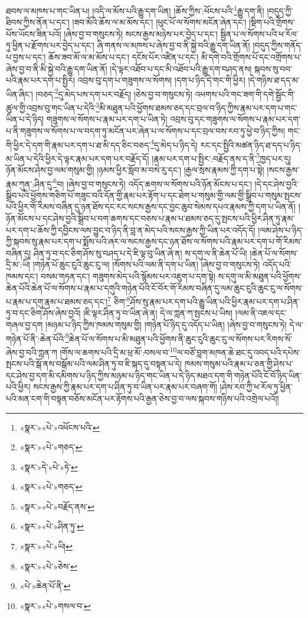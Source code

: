 ཐབས་ལ་མཁས་པ་གང་ཡིན་པ། །འདི་ལ་མོས་པའི་རྒྱུ་དག་ཡིན། །ཆོས་ཀྱིས་:ཕོངས་པའི་\footnote{«སྣར་»«པེ་»འཕོངས་པའི་}རྒྱུ་དག་ནི། །བདུད་ཀྱི་ཐིབས་ཀྱིས་ནོན་པ་དང་། །ཟབ་མོའི་ཆོས་ལ་མ་མོས་དང་། །ཕུང་པོ་ལ་སོགས་མངོན་ཞེན་དང་། །སྡིག་པའི་གྲོགས་པོས་ཡོངས་ཟིན་པའོ། །ཞེས་བྱ་བ་གསུངས་ཏེ། སངས་རྒྱས་མཉེས་པར་བྱེད་པ་དང་། སྦྱིན་པ་ལ་སོགས་པའི་ཕ་རོལ་ཏུ་ཕྱིན་པ་རྫོགས་པར་བྱེད་པ་དང་། ཞི་གནས་ལ་མཁས་པ་ཞེས་བྱ་བ་ནི་སྐྱེ་བའི་རྒྱུ་དག་ཡིན་ནོ། །བདུད་ཀྱིས་གནོད་པ་བྱས་པ་དང་། ཆོས་ཟབ་མོ་ལ་མ་མོས་པ་དང་། དངོས་པོར་འཛིན་པ་དང་། མི་དགེ་བའི་གྲོགས་པོ་དང་འགྲོགས་པ་ཞེས་བྱ་བ་ནི་མི་སྐྱེ་བའི་རྒྱུ་དག་ཡིན་ནོ། །དེ་ལྟར་འཐོབ་པ་དང་མི་འཐོབ་པའི་རྒྱུ་དག་བཤད་ནས། སྐབས་སུ་བབ་པའི་རྣམ་པར་དག་པ་སྤྱིར། འབྲས་བུ་དག་པ་གཟུགས་ལ་སོགས། །དག་པ་ཉིད་དེ་གང་གི་ཕྱིར། །དེ་གཉིས་ཐ་དད་མ་ཡིན་ཞིང་། །བཅད་\footnote{«སྣར་»«པེ་»གཅད་}དུ་མེད་པས་དག་པར་བརྗོད། །ཅེས་བྱ་བ་གསུངས་ཏེ། འཕགས་པའི་གང་ཟག་གི་དགེ་སྦྱོང་གི་ཚུལ་གྱི་འབྲས་བུ་གང་ཡིན་པ་དེའི་\footnote{«སྣར་»དེ་«པེ་»ཏེ་}མི་མཐུན་པའི་ཕྱོགས་ཐམས་ཅད་དང་བྲལ་བ་ཉིད་ཀྱིས་རྣམ་པར་དག་པ་གང་ཡིན་པ་དེ་ཉིད། གཟུགས་ལ་སོགས་པ་རྣམ་པར་དག་པ་ཡིན་ཏེ། འབྲས་བུ་དང་གཟུགས་ལ་སོགས་པ་རྣམ་པར་དག་པ་ནི་གཟུགས་ལ་སོགས་པ་ལ་བདག་ཏུ་མངོན་པར་ཞེན་པ་ལ་སོགས་པ་དང་བྲལ་བས་རབ་ཏུ་ཕྱེ་བ་ཉིད་ཀྱིས། གང་གི་ཕྱིར་དེ་དག་གི་རྣམ་པར་དག་པ་ཐ་མི་དད་ཅིང་བཅད་\footnote{«སྣར་»«པེ་»གཅད་}དུ་མེད་པ་ཉིད་དེ། རང་དང་སྤྱིའི་མཚན་ཉིད་ཐ་དད་པ་ཉིད་མ་ཡིན་པ་དེའི་ཕྱིར་དེ་ལྟར་རྣམ་པར་དག་པར་བརྗོད་དོ། །རྣམ་པར་དག་པ་སྤྱིར་:བརྗོད་ནས་ད་ནི་\footnote{«སྣར་»«པེ་»བརྗོད་ནས་}ཁྱད་པར་དུ། ཉོན་མོངས་ཤེས་བྱ་ལམ་གསུམ་གྱི། །ཉམས་ཕྱིར་སློབ་མ་བསེ་རུ་དང་། །རྒྱལ་སྲས་རྣམས་ཀྱི་དག་པ་སྟེ། །སངས་རྒྱས་རྣམ་ཀུན་:ཤིན་དུ་\footnote{«སྣར་»«པེ་»ཤིན་ཏུ་}བ། །ཞེས་བྱ་བ་གསུངས་ཏེ། འདོད་ཆགས་ལ་སོགས་པའི་ཉོན་མོངས་པ་དང་། །དེ་དང་ཤེས་བྱའི་སྒྲིབ་པའི་ཕྱོགས་གཅིག་པོ་གཟུང་བའི་དོན་གྱི་རྣམ་པར་རྟོག་པ་དང་ཐེག་པ་གསུམ་གྱི་ལམ་གྱི་སྒྲིབ་པ་གསུམ་སྤངས་པའི་ཕྱིར་གོ་རིམས་བཞིན་དུ་ཉན་ཐོས་དང་རང་སངས་རྒྱས་དང་བྱང་ཆུབ་སེམས་དཔའ་རྣམས་ཀྱི་དག་པ་ཡིན་ནོ། །ཉོན་མོངས་པ་དང་ཤེས་བྱའི་སྒྲིབ་པ་བག་ཆགས་དང་བཅས་པ་རྣམ་པ་ཐམས་ཅད་དུ་སྤངས་པའི་ཕྱིར་ཤིན་ཏུ་རྣམ་པར་དག་པ་ཆོས་ཀྱི་དབྱིངས་ལས་བྱུང་བ་ཉིད་ནི་བླ་ན་མེད་པའི་སངས་རྒྱས་ཀྱི་ཡིན་པར་འདོད་དོ། །ལམ་ཤེས་པ་ཉིད་ཀྱི་སྐབས་སུ་རྣམ་པར་དག་པ་སྨོས་པའི་ཞར་ལ་སངས་རྒྱས་དང་ཉན་ཐོས་ལ་སོགས་པའི་རྣམ་པར་དག་པ་གོ་རིམས་བཞིན་དུ། ཤིན་ཏུ་བ་དང་ཅིག་ཤོས་སུ་བཤད་པ་དེ་ཇི་ལྟ་བུ་ཡིན་ཞེ་ན། ས་དགུ་ལ་ནི་ཆེན་པོ་ཡི། །ཆེན་པོ་ལ་སོགས་དྲི་མ་:ཡི། །གཉེན་པོ་ཆུང་ངུའི་ཆུང་ངུ་ལ། །སོགས་པའི་ལམ་ནི་དག་པ་ཡིན། །ཞེས་བྱ་བ་གསུངས་ཏེ། འདོད་པའི་ཁམས་དང་། བསམ་གཏན་དང་། གཟུགས་མེད་པའི་སྙོམས་པར་འཇུག་པ་དག་སྟེ། ས་དགུ་ལ་མི་མཐུན་པའི་ཕྱོགས་ཆེན་པོའི་ཆེན་པོ་ལ་སོགས་པ་རྣམ་པ་དགུའི་གཉེན་པོའི་ངོ་བོར་གོ་རིམས་བཞིན་དུ་ལམ་ཆུང་ངུའི་ཆུང་ངུ་ལ་སོགས་པ་རྣམ་པ་དགུ་རྣམ་པ་ཐམས་ཅད་དང་།\footnote{«སྣར་»«པེ་»ཡི།} ཅིག་\footnote{«སྣར་»«པེ་»ཅེས་}ཤོས་སུ་རྣམ་པར་དག་པའི་རྒྱུ་ཡིན་པའི་ཕྱིར་རྣམ་པར་དག་པ་ཤིན་ཏུ་བ་དང་ཅིག་ཤོས་ཞེས་བྱའོ། །ཇི་ལྟར་ཤིན་ཏུ་བ་ཡིན་ཞེ་ན། དེ་ལ་ཀླན་ཀ་སྤངས་པ་ཡིས། །ལམ་ནི་འཇལ་དང་གཞལ་བྱ་དག །མཉམ་པ་ཉིད་ཀྱིས་ཁམས་གསུམ་གྱི། །གཉེན་པོ་ཉིད་དུ་འདོད་པ་ཡིན། །ཞེས་བྱ་བ་གསུངས་ཏེ། དེ་ལ་གཉེན་པོ་ནི་:ཆེན་པོའི་\footnote{«པེ་»ཆེན་པོ་ནི་}ཆེན་པོ་ལ་སོགས་པ་མི་མཐུན་པའི་ཕྱོགས་ནི་ཆུང་ངུའི་ཆུང་ངུ་ལ་སོགས་པར་རིགས་སོ་ཞེས་བྱ་བའི་ཀླན་ཀ །གོས་ལ་ཆགས་པའི་དྲི་མ་ཕྲ་མོ་:བསལ་བ་\footnote{«སྣར་»«པེ་»གསལ་བ་}ལ་བཙོ་བླག་མཁན་ཆེ་ཐང་དུ་འབད་པའི་དཔེས་སྤངས་པའི་སྒོ་ནས་བསྒོམ་པའི་ལམ་ཤིན་ཏུ་བ་ཇི་སྐད་དུ་བསྟན་པ་དེ། ཁམས་གསུམ་པའི་རྣམ་པ་ཅན་གྱི་ཤེས་པ་དང་ཤེས་བྱ་དག་མི་དམིགས་པ་ཉིད་ཀྱིས་མཉམ་པ་ཉིད་གང་ཡིན་པ་དེ་ཉིད་མཐའ་དག་གི་གཉེན་པོའི་ངོ་བོ་ཉིད་ཡིན་པའི་ཕྱིར། སངས་རྒྱས་ཀྱི་རྣམ་པར་དག་པ་ཤིན་ཏུ་བ་ཡིན་པར་རྣམ་པར་བཞག་གོ། །ཤེས་རབ་ཀྱི་ཕ་རོལ་ཏུ་ཕྱིན་པའི་མན་ངག་གི་བསྟན་བཅོས་མངོན་པར་རྟོགས་པའི་རྒྱན་ཅེས་བྱ་བ་ལས་སྐབས་གཉིས་པའི་འགྲེལ་པའོ།། 